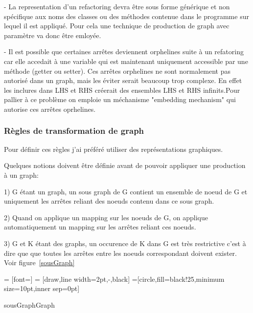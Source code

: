 \documentclass[a4paper, 12pt]{article}
\begin{document}
- La representation d'un refactoring devra être sous forme générique et non spécifique aux noms des classes ou des méthodes contenue dans le programme sur lequel il est appliqué. Pour cela une technique de production de graph avec paramètre va donc être emloyée. 

- Il est possible que certaines arrêtes deviennent orphelines suite à un refatoring car elle accedait à une variable qui est maintenant uniquement accessible par une méthode (getter ou setter). Ces arrêtes orphelines ne sont normalement pas autorisé dans un graph, mais les éviter serait beaucoup trop complexe. En effet les inclures dans LHS et RHS créerait des ensembles LHS et RHS infinits.Pour pallier à ce problème on emploie un méchanisme "embedding mechanism" qui autorise ces arrêtes oprhelines.

\subsubsection{Règles de transformation de graph}

Pour définir ces règles j'ai préféré utiliser des représentations graphiques.

Quelques notions doivent être définie avant de pouvoir appliquer une production à un graph:

1) G étant un graph, un sous graph de G contient un ensemble de noeud de G et uniquement les arrêtes reliant des noeuds contenu dans ce sous graph. 

2) Quand on applique un mapping sur les noeuds de G, on applique automatiquement un mapping sur les arrêtes reliant ces noeuds.

3) G et K étant des graphs, un occurence de K dans G est très restrictive c'est à dire que que toutes les arrêtes entre les noeuds correspondant doivent exister. 
Voir figure~\ref{sousGraph} 

 = [font=\small]
 = [draw,line width=2pt,-,black]
=[circle,fill=black!25,minimum size=10pt,inner sep=0pt]
\begin{myfig}{sousGraph}{Graph}
\end{myfig}
\end{document}
